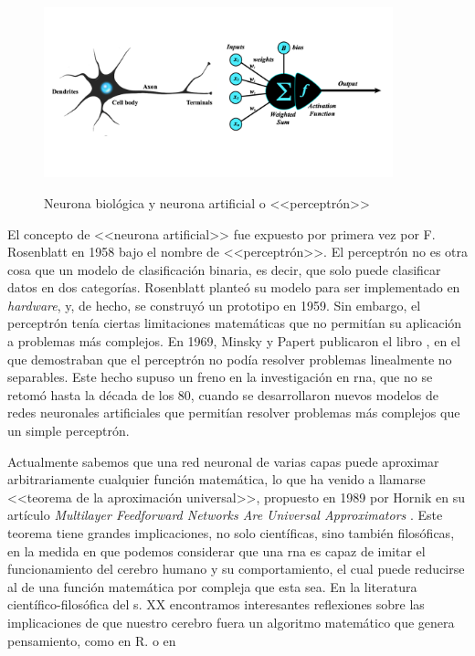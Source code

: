 \begin{figure}[H]
    \caption[Neurona biológica y neurona artificial o <<perceptrón>>]{Neurona biológica y neurona artificial o <<perceptrón>>}
    \centering
    \includegraphics[width=0.9\textwidth]{./figuras/perceptron_with_neuron.png}
    \label{fig:neurona_artificial_natural}
\end{figure}

El concepto de <<neurona artificial>> fue expuesto por primera vez por F. Rosenblatt en 1958 \citep{rothmanTransformersNaturalLanguage2021} bajo el nombre de <<perceptrón>>. El perceptrón no es otra cosa que un modelo de clasificación binaria, es decir, que solo puede clasificar datos en dos categorías. Rosenblatt planteó su modelo para ser implementado en \textit{hardware}, y, de hecho, se construyó un prototipo en 1959. Sin embargo, el perceptrón tenía ciertas limitaciones matemáticas que no permitían su aplicación a problemas más complejos. En 1969, Minsky y Papert publicaron el libro \citep{minsky1969perceptrons}, en el que demostraban que el perceptrón no podía resolver problemas linealmente no separables. Este hecho supuso un freno en la investigación en \gls{rna}, que no se retomó hasta la década de los 80, cuando se desarrollaron nuevos modelos de redes neuronales artificiales que permitían resolver problemas más complejos que un simple perceptrón. 

Actualmente sabemos que una red neuronal de varias capas puede aproximar arbitrariamente cualquier función matemática, lo que ha venido a llamarse <<teorema de la aproximación universal>>, propuesto en 1989 por Hornik en su artículo \textit{Multilayer Feedforward Networks Are Universal Approximators} \citep{hornikMultilayerFeedforwardNetworks1989}. Este teorema tiene grandes implicaciones, no solo científicas, sino también filosóficas, en la medida en que podemos considerar que una \gls{rna} es capaz de imitar el funcionamiento del cerebro humano y su comportamiento, el cual puede reducirse al de una función matemática por compleja que esta sea. En la literatura científico-filosófica del s. XX encontramos interesantes reflexiones sobre las implicaciones de que nuestro cerebro fuera un algoritmo matemático que genera pensamiento, como en R. \cite{penroseNuevaMenteEmperador2015} o en \cite{searleMentesCerebrosCiencia1985}


